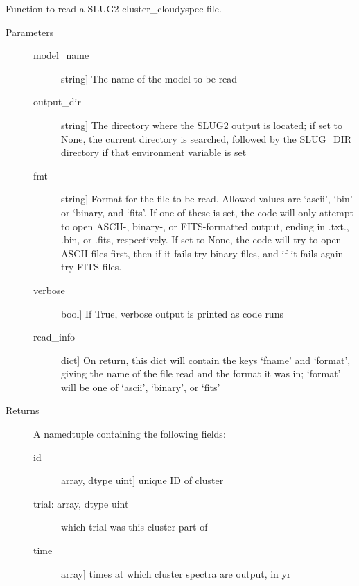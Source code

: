 \documentclass[letterpaper,10pt,english]{sphinxmanual}
\begin{document}
\begin{fulllineitems}
\label{\detokenize{cloudy:slugpy.cloudy.read_cluster_cloudyspec}}
Function to read a SLUG2 cluster\_cloudyspec file.
\begin{description}
\item[{Parameters}] \leavevmode\begin{description}
\item[{model\_name}] \leavevmode{[}string{]}
The name of the model to be read

\item[{output\_dir}] \leavevmode{[}string{]}
The directory where the SLUG2 output is located; if set to None,
the current directory is searched, followed by the SLUG\_DIR
directory if that environment variable is set

\item[{fmt}] \leavevmode{[}string{]}
Format for the file to be read. Allowed values are ‘ascii’,
‘bin’ or ‘binary, and ‘fits’. If one of these is set, the code
will only attempt to open ASCII-, binary-, or FITS-formatted
output, ending in .txt., .bin, or .fits, respectively. If set
to None, the code will try to open ASCII files first, then if
it fails try binary files, and if it fails again try FITS
files.

\item[{verbose}] \leavevmode{[}bool{]}
If True, verbose output is printed as code runs

\item[{read\_info}] \leavevmode{[}dict{]}
On return, this dict will contain the keys ‘fname’ and
‘format’, giving the name of the file read and the format it
was in; ‘format’ will be one of ‘ascii’, ‘binary’, or ‘fits’

\end{description}

\item[{Returns}] \leavevmode
A namedtuple containing the following fields:
\begin{description}
\item[{id}] \leavevmode{[}array, dtype uint{]}
unique ID of cluster

\item[{trial: array, dtype uint}] \leavevmode
which trial was this cluster part of

\item[{time}] \leavevmode{[}array{]}
times at which cluster spectra are output, in yr


\end{description}
\end{description}
\end{fulllineitems}
\end{document}
